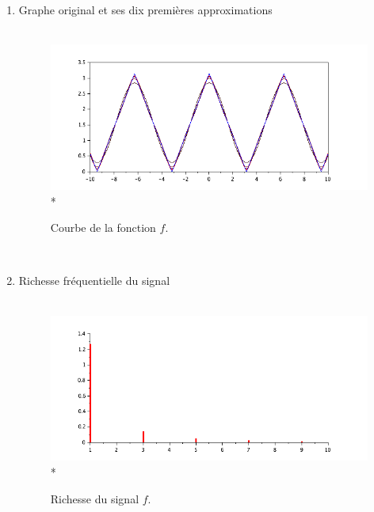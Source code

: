 \documentclass[a4paper,12pt]{report}
\begin{document}
\begin{enumerate}
\begin{enumerate}
			\item Graphe original et ses dix premières approximations \\ \\
			\begin{figure}[h!]
				\centering
				\includegraphics[scale=0.6]{ex1_fig3_1.png}\\*
				\caption{\label{ex1_figure3_1}Courbe de la fonction $f$.}
			\end{figure}\\
		
			\item Richesse fréquentielle du signal \\ \\
			\begin{figure}[h!]
				\centering
				\includegraphics[scale=0.6]{ex1_fig3_2.png}\\*
				\caption{\label{ex1_figure3_2}Richesse du signal $f$.}
			\end{figure}\\
		\end{enumerate}
				\newpage
		

\end{enumerate}
\end{document}
